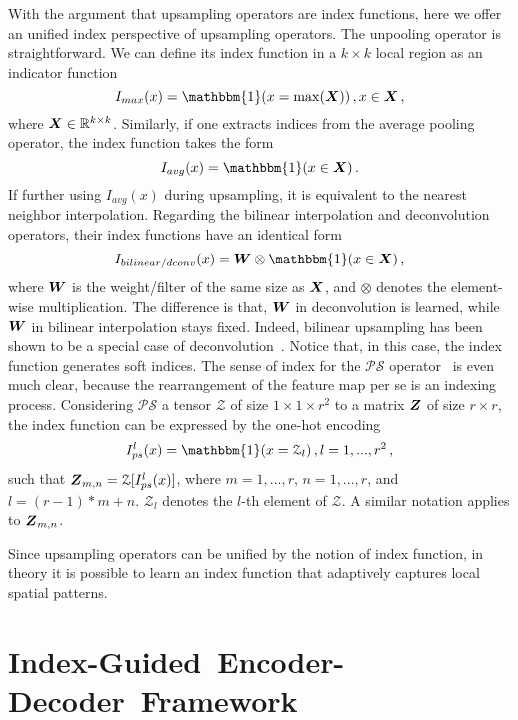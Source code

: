 \documentclass[10pt,twocolumn,letterpaper]{article}
\newcommand{\mat}[1]{\mbox{\boldsymbol{$#1$}}}
\begin{document}
With the argument that upsampling operators are index functions, here we offer an unified index perspective of upsampling operators. The unpooling operator is straightforward. We can define its index function in a $k\times k$ local region as an indicator function
\begin{equation}
I_{max}(x)=\mathbbm{1}(x=\max (\mat X))\,,x\in\mat X \,,
\end{equation}
where $\mat X\in\mathbb{R}^{k\times k}$. Similarly, if one extracts indices from the average pooling operator, the index function takes the form
\begin{equation}
I_{avg}(x)=\mathbbm{1}(x\in\mat X)\,.
\end{equation}
If further using $I_{avg}(x)$ during upsampling, it is equivalent to the nearest neighbor interpolation. Regarding the bilinear interpolation and deconvolution operators, their index functions have an identical form
\begin{equation}
I_{bilinear/dconv}(x)=\mat W\otimes\mathbbm{1}(x\in\mat X)\,,
\end{equation}
where $\mat W$ is the weight/filter of the same size as $\mat X$, and $\otimes$ denotes the element-wise multiplication. The difference is that, $\mat W$ in deconvolution is learned, while $\mat W$ in bilinear interpolation stays fixed. Indeed, bilinear upsampling has been shown to be a special case of deconvolution~\cite{long2015fully}. Notice that, in this case, the index function generates soft indices. The sense of index for the $\mathcal{PS}$ operator~\cite{shi2016real} is even much clear, because the rearrangement of the feature map per se is an indexing process. Considering $\mathcal{PS}$ a tensor $\mathcal{Z}$ of size $1\times1\times r^2$ to a matrix $\mat Z$ of size $r\times r$, the index function can be expressed by the one-hot encoding
\begin{equation}
I^l_{ps}(x)=\mathbbm{1}(x= \mathcal{Z}_l)\,,l=1,...,r^2\,,
\end{equation}
such that $\mat Z_{m,n}=\mathcal{Z}[I^l_{ps}(x)]$, where $m=1,...,r$, $n=1,...,r$, and $l=(r-1)*m+n$. $\mathcal{Z}_l$ denotes the $l$-th element of $\mathcal{Z}$. A similar notation applies to $\mat Z_{m,n}$.

Since upsampling operators can be unified by the notion of index function, in theory it is possible to learn an index function that adaptively captures local spatial patterns.

\section{\mbox{Index-Guided Encoder-Decoder Framework}}
\end{document}
